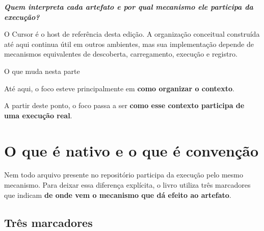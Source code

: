 \documentclass[
  10pt,
  a4paper,
  oneside]{book}
\renewenvironment{quote}
  {\def\FrameCommand{\fboxsep=10pt\colorbox{LightBlue}}%
   \MakeFramed{\advance\hsize-\width\FrameRestore}\itshape}
  {\endMakeFramed}
\begin{document}
\begin{quote}
\textbf{Quem interpreta cada artefato e por qual mecanismo ele participa
da execução?}
\end{quote}

O Cursor é o host de referência desta edição. A organização conceitual
construída até aqui continua útil em outros ambientes, mas sua
implementação depende de mecanismos equivalentes de descoberta,
carregamento, execução e registro.

\begin{infobox}{O que muda nesta parte}

Até aqui, o foco esteve principalmente em \textbf{como organizar o
contexto}.

A partir deste ponto, o foco passa a ser \textbf{como esse contexto
participa de uma execução real}.

\end{infobox}

\hypertarget{o-que-uxe9-nativo-e-o-que-uxe9-convenuxe7uxe3o}{%
\section{O que é nativo e o que é
convenção}\label{o-que-uxe9-nativo-e-o-que-uxe9-convenuxe7uxe3o}}

Nem todo arquivo presente no repositório participa da execução pelo
mesmo mecanismo. Para deixar essa diferença explícita, o livro utiliza
três marcadores que indicam \textbf{de onde vem o mecanismo que dá
efeito ao artefato}.

\hypertarget{truxeas-marcadores}{%
\subsection{Três marcadores}\label{truxeas-marcadores}}
\end{document}

